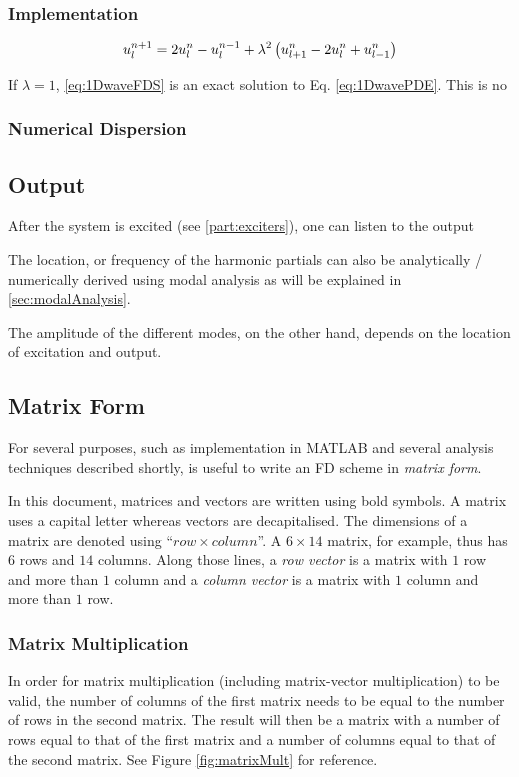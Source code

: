 \subsubsection{Implementation}
\begin{equation}\label{eq:1DwaveUpdate}
    u_l^{n+1} = 2 u_l^n - u_l^{n-1} + \lambda^2 \left(u_{l+1}^n - 2 u_l^n + u_{l-1}^n\right)
\end{equation}

If $\lambda = 1$, \eqref{eq:1DwaveFDS} is an exact solution to Eq. \eqref{eq:1DwavePDE}. This is no

\subsubsection{Numerical Dispersion}


\subsection{Output}
After the system is excited (see \ref{part:exciters}), one can listen to the output

The location, or frequency of the harmonic partials can also be analytically / numerically derived using modal analysis as will be explained in \ref{sec:modalAnalysis}.

The amplitude of the different modes, on the other hand, depends on the location of excitation and output. 


\subsection{Matrix Form}
For several purposes, such as implementation in MATLAB and several analysis techniques described shortly, is useful to write an FD scheme in \textit{matrix form}. 

In this document, matrices and vectors are written using bold symbols. A matrix uses a capital letter whereas vectors are decapitalised. The dimensions of a matrix are denoted using ``$row \times column$''. A $6\times 14$ matrix, for example, thus has $6$ rows and $14$ columns. Along those lines, a \textit{row vector} is a matrix with $1$ row and more than $1$ column and a \textit{column vector} is a matrix with $1$ column and more than $1$ row. 

\subsubsection{Matrix Multiplication}
In order for matrix multiplication (including matrix-vector multiplication) to be valid, the number of columns of the first matrix needs to be equal to the number of rows in the second matrix. The result will then be a matrix with a number of rows equal to that of the first matrix and a number of columns equal to that of the second matrix. See Figure \ref{fig:matrixMult} for reference.

